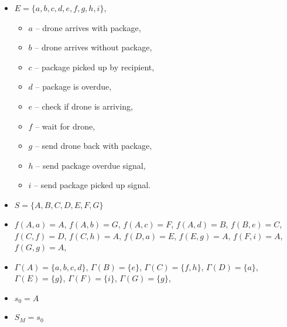 \begin{itemize}
    \item $E = \{a,b,c, d, e, f, g, h,i\}$,
    \begin{itemize}
        \item $a$ -- drone arrives with package,
        \item $b$ -- drone arrives without package,
        \item $c$ -- package picked up by recipient,
        \item $d$ -- package is overdue,
        \item $e$ -- check if drone is arriving,
        \item $f$ -- wait for drone,
        \item $g$ -- send drone back with package,
        \item $h$ -- send package overdue signal,
        \item $i$ -- send package picked up signal.
    \end{itemize}
    \item $S = \{A, B,C,D,E,F,G\}$
    \item $f(A,a) = A$, $f(A,b) = G$, $f(A,c) = F$, $f(A,d) = B$, $f(B,e) = C$, $f(C,f) = D$, $f(C,h) = A$, $f(D,a) = E$, $f(E,g) = A$, $f(F,i) = A$, $f(G,g) = A$,
    \item $\Gamma(A) = \{a,b,c,d\}$, $\Gamma(B) = \{e\}$, $\Gamma(C) = \{f,h\}$, $\Gamma(D) = \{a\}$, $\Gamma(E) = \{g\}$, $\Gamma(F) = \{i\}$, $\Gamma(G) = \{g\}$,
    \item $s_0 = A$
    \item $S_M = s_0$
\end{itemize}


